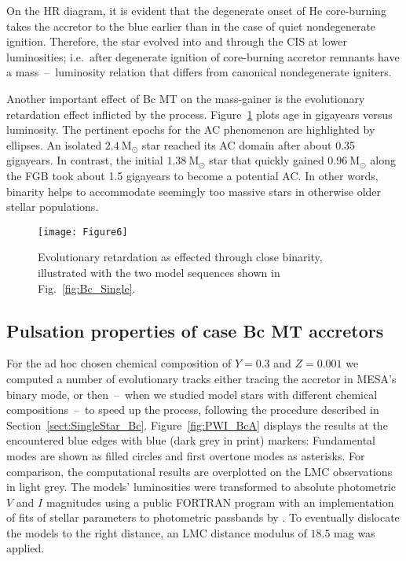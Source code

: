 \documentclass[a4paper,fleqn,usenatbib]{mnras}
\newcommand{\msol}{~\mathrm{M}_\odot}
\begin{document}
On the HR diagram, it is evident that the degenerate onset of He core-burning 
takes the accretor to the blue earlier than 
in the case of quiet nondegenerate ignition. Therefore, the star evolved into and through 
the CIS at lower luminosities; i.e.~after degenerate ignition of core-burning
accretor remnants  have a mass~--~luminosity relation that differs from canonical 
nondegenerate igniters.

Another important effect of Bc MT on the mass-gainer is the evolutionary retardation 
effect inflicted by the process. Figure~\ref{fig:Bc_Retardation} plots age in gigayears 
versus luminosity. The pertinent epochs for the AC phenomenon are highlighted by ellipses. 
An isolated $2.4 \msol$ star reached its AC domain after about
0.35 gigayears. In contrast, the initial $1.38 \msol$ star that quickly gained $0.96 \msol$ along 
the FGB took about 1.5 gigayears to become a potential AC. 
In other words, binarity helps to accommodate seemingly too massive stars in otherwise
older stellar populations. 

\begin{figure}
	\texttt{[image: Figure6]}
    \caption{Evolutionary retardation as effected through close binarity, illustrated with the 
    	 	 two model sequences shown in Fig.~\ref{fig:Bc_Single}. 
    	    }
    \label{fig:Bc_Retardation}
\end{figure}

\subsection{Pulsation properties of case Bc MT accretors}
For the ad hoc chosen chemical composition of $Y=0.3$ and $Z=0.001$ we computed a number of 
evolutionary tracks either tracing the accretor in MESA's binary mode, or then~--~when we
studied model stars with different chemical compositions~--~to speed up the process,
following the procedure described in Section~\ref{sect:SingleStar_Bc}. 
Figure~\ref{fig:PWI_BcA} displays the results at the encountered blue edges with blue 
(dark grey in print) markers: Fundamental modes are shown as filled circles and first overtone
modes as asterisks. For comparison, the computational results are overplotted on the 
LMC observations in light grey.
The models' luminosities were transformed to absolute photometric $V$ and $I$ magnitudes using a 
public FORTRAN program with an implementation of fits of stellar parameters to photometric
passbands by \citet{Worthey2011}. To eventually dislocate the models to the right distance, 
an LMC distance modulus of $18.5$ mag was applied.  
\end{document}
